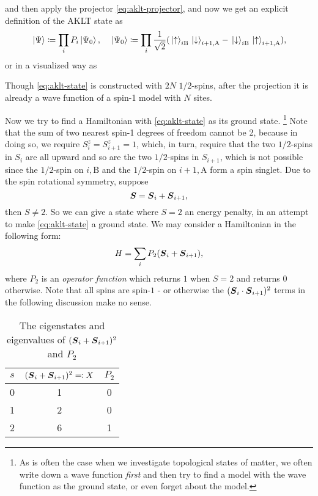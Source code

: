 \documentclass[hyperref, a4paper]{article}
\begin{document}
and then apply the projector \eqref{eq:aklt-projector}, and now we get an explicit definition of the AKLT state as  
\begin{equation}
    \ket*{\Psi} \coloneqq \prod_{i} P_i \ket*{\Psi_0}, \quad \ket*{\Psi_0} \coloneqq \prod_i \frac{1}{\sqrt{2}} (\ket*{\uparrow}_{i \text{B}} \ket*{\downarrow}_{i+1, \text{A}} - \ket*{\downarrow}_{i \text{B}} \ket*{\uparrow}_{i+1, \text{A}}),
    \label{eq:aklt-state}
\end{equation}
or in a visualized way as 

Though \eqref{eq:aklt-state} is constructed with $2N$ $1/2$-spins, after the projection it is already a wave function of a spin-1 model with $N$ sites.

Now we try to find a Hamiltonian with \eqref{eq:aklt-state} as its ground state. %
\footnote{
    As is often the case when we investigate topological states of matter,  we often write down a wave function \emph{first} and then try to find a model with the wave function as the ground state, or even forget about the model.
}%
Note that the sum of two nearest spin-1 degrees of freedom cannot be 2, because in doing so, we require $S^z_i = S^z_{i+1} = 1$, which, in turn, require that the two $1/2$-spins in $S_i$ are all upward and so are the two $1/2$-spins in $S_{i+1}$, which is not possible since the $1/2$-spin on $i, \text{B}$ and the $1/2$-spin on $i+1, \text{A}$ form a spin singlet. 
Due to the spin rotational symmetry, suppose 
\[
    \vb*{S} = \vb*{S}_i + \vb*{S}_{i+1},
\]
then $S \neq 2$.
So we can give a state where $S = 2$ an energy penalty, in an attempt to make \eqref{eq:aklt-state} a ground state.
We may consider a Hamiltonian in the following form: 
\begin{equation}
    H = \sum_{i} P_2 (\vb*{S}_i + \vb*{S}_{i+1}) , 
    \label{eq:aklt-model-original}
\end{equation}
where $P_2$ is an \emph{operator function} which returns $1$ when $S = 2$ and returns $0$ otherwise.
Note that all spins are spin-$1$ - or otherwise the $(\vb*{S}_i \cdot \vb*{S}_{i+1})^2$ terms in the following discussion make no sense.

\begin{table}[H]
    \caption{The eigenstates and eigenvalues of $(\vb*{S}_i + \vb*{S}_{i+1})^2$ and $P_2$}
    \label{tab:s-2-eigs}
    \centering
    \label{table1}
    \begin{tabular}[c]{ccc}
        \toprule
        $s$ & $(\vb*{S}_i + \vb*{S}_{i+1})^2 \eqqcolon X$ & $P_2$ \\ 
        \midrule
        0 & 1 & 0 \\
        1 & 2 & 0 \\
        2 & 6 & 1 \\
        \bottomrule
    \end{tabular}
\end{table} 
\end{document}
